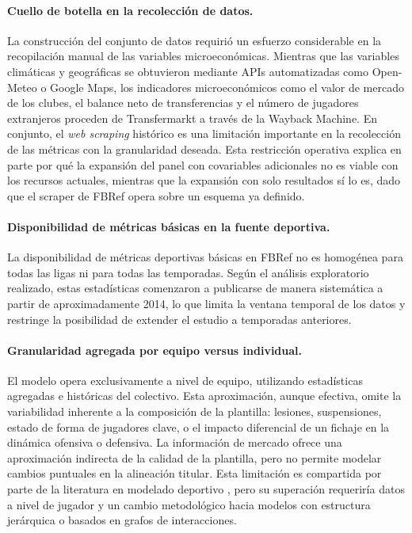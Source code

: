 \paragraph{Cuello de botella en la recolecci\'on de datos.} La construcci\'on del conjunto de datos requiri\'o un esfuerzo considerable en la recopilaci\'on manual de las variables microecon\'omicas. Mientras que las variables clim\'aticas y geogr\'aficas se obtuvieron mediante APIs automatizadas como Open-Meteo o Google Maps, los indicadores microecon\'omicos como el valor de mercado de los clubes, el balance neto de transferencias y el n\'umero de jugadores extranjeros proceden de Transfermarkt \cite{Transfermarkt} a trav\'es de la Wayback Machine. En conjunto, el \textit{web scraping} hist\'orico es una limitaci\'on importante en la recolecci\'on de las m\'etricas con la granularidad deseada. Esta restricci\'on operativa explica en parte por qu\'e la expansi\'on del panel con covariables adicionales no es viable con los recursos actuales, mientras que la expansi\'on con solo resultados s\'i lo es, dado que el scraper de FBRef opera sobre un esquema ya definido.

\paragraph{Disponibilidad de m\'etricas b\'asicas en la fuente deportiva.} La disponibilidad de m\'etricas deportivas b\'asicas en FBRef no es homog\'enea para todas las ligas ni para todas las temporadas. Seg\'un el an\'alisis exploratorio realizado, estas estad\'isticas comenzaron a publicarse de manera sistem\'atica a partir de aproximadamente 2014, lo que limita la ventana temporal de los datos y restringe la posibilidad de extender el estudio a temporadas anteriores.

\paragraph{Granularidad agregada por equipo versus individual.} El modelo opera exclusivamente a nivel de equipo, utilizando estad\'isticas agregadas e hist\'oricas del colectivo. Esta aproximaci\'on, aunque efectiva, omite la variabilidad inherente a la composici\'on de la plantilla: lesiones, suspensiones, estado de forma de jugadores clave, o el impacto diferencial de un fichaje en la din\'amica ofensiva o defensiva. La informaci\'on de mercado ofrece una aproximaci\'on indirecta de la calidad de la plantilla, pero no permite modelar cambios puntuales en la alineaci\'on titular. Esta limitaci\'on es compartida por parte de la literatura en modelado deportivo \cite{karlis2003}, pero su superaci\'on requerir\'ia datos a nivel de jugador y un cambio metodol\'ogico hacia modelos con estructura jer\'arquica o basados en grafos de interacciones.

